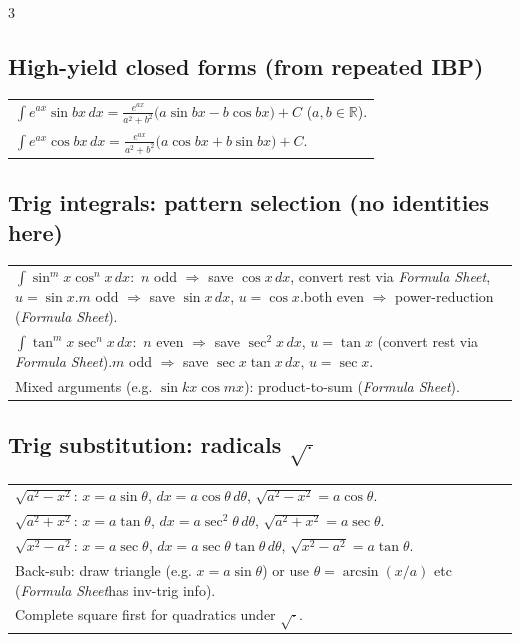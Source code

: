 \documentclass[10pt]{article}
\newcommand{\R}{\mathbb{R}}
\newcommand{\FS}{\textit{Formula Sheet}}
\begin{document}
\begin{multicols}{3}
\subsection*{High-yield closed forms (from repeated IBP)}
\vspace{-1pt}
\begin{tabular}{@{}p{}@{}}
$\displaystyle\int e^{ax}\sin bx\,dx=\frac{e^{ax}}{a^2+b^2}\big(a\sin bx-b\cos bx\big)+C$ ($a,b\in\R$).\\
$\displaystyle\int e^{ax}\cos bx\,dx=\frac{e^{ax}}{a^2+b^2}\big(a\cos bx+b\sin bx\big)+C$.\\
\end{tabular}

\subsection*{Trig integrals: pattern selection (no identities here)}
\vspace{-1pt}
\begin{tabular}{@{}p{}@{}}
$\int\sin^m x\cos^n x\,dx$:\ \(n\) odd $\Rightarrow$ save $\cos x\,dx$, convert rest via \FS, $u=\sin x$.\quad \(m\) odd $\Rightarrow$ save $\sin x\,dx$, $u=\cos x$.\quad both even $\Rightarrow$ power-reduction (\FS).\\
$\int\tan^m x\sec^n x\,dx$:\ \(n\) even $\Rightarrow$ save $\sec^2x\,dx$, $u=\tan x$ (convert rest via \FS).\quad \(m\) odd $\Rightarrow$ save $\sec x\tan x\,dx$, $u=\sec x$.\\
Mixed arguments (e.g. $\sin kx\cos mx$): product-to-sum (\FS).\\
\end{tabular}

\subsection*{Trig substitution: radicals $\sqrt{\cdot}$}
\vspace{-1pt}
\begin{tabular}{@{}p{}@{}}
$\sqrt{a^2-x^2}$: $x=a\sin\theta$, $dx=a\cos\theta\,d\theta$, $\sqrt{a^2-x^2}=a\cos\theta$.\\
$\sqrt{a^2+x^2}$: $x=a\tan\theta$, $dx=a\sec^2\theta\,d\theta$, $\sqrt{a^2+x^2}=a\sec\theta$.\\
$\sqrt{x^2-a^2}$: $x=a\sec\theta$, $dx=a\sec\theta\tan\theta\,d\theta$, $\sqrt{x^2-a^2}=a\tan\theta$.\\
Back-sub: draw triangle (e.g. $x=a\sin\theta$) or use $\theta=\arcsin(x/a)$ etc (\FS has inv-trig info).\\
Complete square first for quadratics under $\sqrt{\cdot}$.\\
\end{tabular}


\end{multicols}
\end{document}
